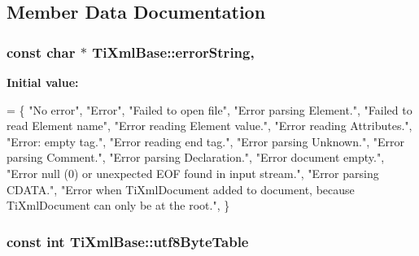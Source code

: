 \subsection{Member Data Documentation}
\hypertarget{class_ti_xml_base_a7ac8feec4100e446b3d78e1ac0659700}{
\subsubsection[{error\+String}]{\setlength{\rightskip}{0pt plus 5cm}const char $\ast$ Ti\+Xml\+Base\+::error\+String\hspace{0.3cm}{\ttfamily [static]}, {\ttfamily [protected]}}}\label{class_ti_xml_base_a7ac8feec4100e446b3d78e1ac0659700}
{\bfseries Initial value\+:}
\begin{DoxyCode}
=
\{
    \textcolor{stringliteral}{"No error"},
    \textcolor{stringliteral}{"Error"},
    \textcolor{stringliteral}{"Failed to open file"},
    \textcolor{stringliteral}{"Error parsing Element."},
    \textcolor{stringliteral}{"Failed to read Element name"},
    \textcolor{stringliteral}{"Error reading Element value."},
    \textcolor{stringliteral}{"Error reading Attributes."},
    \textcolor{stringliteral}{"Error: empty tag."},
    \textcolor{stringliteral}{"Error reading end tag."},
    \textcolor{stringliteral}{"Error parsing Unknown."},
    \textcolor{stringliteral}{"Error parsing Comment."},
    \textcolor{stringliteral}{"Error parsing Declaration."},
    \textcolor{stringliteral}{"Error document empty."},
    \textcolor{stringliteral}{"Error null (0) or unexpected EOF found in input stream."},
    \textcolor{stringliteral}{"Error parsing CDATA."},
    \textcolor{stringliteral}{"Error when TiXmlDocument added to document, because TiXmlDocument can only be at the root."},
\}
\end{DoxyCode}
\hypertarget{class_ti_xml_base_ac8c86058137bdb4b413c3eca58f2d467}{
\subsubsection[{utf8\+Byte\+Table}]{\setlength{\rightskip}{0pt plus 5cm}const int Ti\+Xml\+Base\+::utf8\+Byte\+Table\hspace{0.3cm}{\ttfamily [static]}}}\label{class_ti_xml_base_ac8c86058137bdb4b413c3eca58f2d467}
